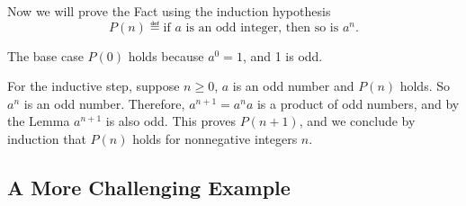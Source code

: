 Now we will prove the Fact using the induction hypothesis
\[
P(n) \eqdef \text{if $a$ is an odd integer, then so is $a^{n}$}.
\]

The base case $P(0)$ holds because $a^{0} =1$, and 1 is odd.

For the inductive step, suppose $n\geq 0$, $a$ is an odd number and $P(n)$
holds.  So $a^n$ is an odd number.  Therefore, $a^{n+1} = a^{n}a$ is a
product of odd numbers, and by the Lemma $a^{n+1}$ is also odd.  This
proves $P(n+1)$, and we conclude by induction that $P(n)$ holds for
nonnegative integers $n$.
\fi

\iffalse
An alternative proof of Lemma~\ref{finmin} that every partial order on a
nonempty finite set has a minimal element can be based on induction.  This
time there is no $n$ mentioned, so we better find one.

We'll use the induction hypothesis
\[
P(n) \eqdef \text{a strict partial order on a set of size $n$ has a minimal
  element}.
\]

As a base case, we'll use $n=1$.  Now $P(1)$ holds because in a
one-element partial order, the element is minimal (and maximal) by
definition.

For the inductive step, assume $P(n)$ holds and consider a strict partial
order, $R$, on a set, $A$, of size $n+1$ for $n \geq 1$.  We will prove
that $A$ has a minimal element.

Now $A$ has 2 or more elements, so pick one and call it $a_0$.  If $a_0$
is a minimal element, then we are done.  Otherwise, let $A'$ be the set $A
- \set{a_0}$ and $R'$ be the relation $R$ restricted to $A'$.

Now it's easy to check that $R'$ is a strict partial order on set $A'$
whose size is $n$.  So by induction, there is an $R'$-minimal element, $m
\in A'$.  We claim that $m$ is also a minimal element of $A$.

Now there is no element $a' \in A'$ such that $a'\,R\,m$, so to prove
$m$ is minimal in $A$,  as long as it is not true that $a_0\,R\, m$

This element $m$ will also be minimal in $A$ unless

Since $a_0$ is not minimal, there is an element $a_1 \in A'$ such that
$a_1\,R\,a_0$.

\fi

\subsection{A More Challenging Example}

